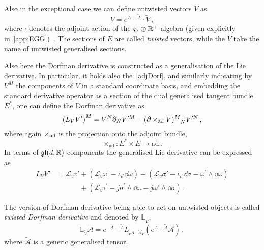 \documentclass[debug]{phd}
\begin{document}
						Also in the exceptional case we can define untwisted vectors $\tilde{V}$ as 
								\begin{equation}
									V = e^{A+ \tilde{A}} \cdot \tilde{V} \, , 
								\end{equation}
						where $\cdot$ denotes the adjoint action of the $\mathfrak{e}_7 \oplus \mathbb{R}^+$ algebra (given explicitly in~\cref{app:EGG})~\cite{waldram5}.
						The sections of $E$ are called \emph{twisted} vectors, while the $\tilde{V}$ take the name of untwisted generalised sections.
							
						Also here the Dorfman derivative is constructed as a generalisation of the Lie derivative. 
						In particular, it holds also the~\eqref{adjDorf}, and similarly indicating by $V^M$ the components of $V$ in a standard coordinate basis, and embedding the standard derivative operator as a section of the dual generalised tangent bundle $E^*$, one can define the Dorfman derivative as
							\begin{equation}\label{dorfMadj}
								\left(L_V V'\right)^M = V^N \partial_N V^{\prime M} - (\partial \times_{\rm ad} V)^M_{\phantom{M}N} V^{\prime N} \, ,
							\end{equation}
						where again $ \times_{\rm ad}$ is the projection onto the adjoint bundle,
								\begin{equation}
									\times_{\mathrm{ad}} : E^* \times E \rightarrow \mathrm{ad}\, . 
								\end{equation}
						In terms of $\mathfrak{gl}(d, \mathbb{R})$ components the generalised Lie derivative can be expressed as
								\begin{equation}\label{dorfM}
									\begin{split}
									L_V V' &= \mathcal{L}_{v} v' + \left(\mathcal{L}_{v} \omega^{\prime} -\iota_{v^\prime}\dd \omega\right) + \left(\mathcal{L}_{v} \sigma' -\iota_{v^\prime}\dd\sigma - \omega^{\prime}\wedge \dd \omega\right) \\
										& \phantom{= \mathcal{L}_{v} v'}+ \left(\mathcal{L}_{v} \tau^{\prime} - j \sigma^{\prime}\wedge \dd \omega - j \omega' \wedge\dd\sigma \right) \, .
									\end{split}
								\end{equation}
						
						The version of Dorfman derivative being able to act on untwisted objects is called \emph{twisted Dorfman derivative} and denoted by $\mathbb{L}_{\tilde{V}}$,
								\begin{equation}
									\mathbb{L}_{\tilde{V}} \tilde{\mathcal{A}} = e^{-A-\tilde{A}}L_{e^{A+\tilde{A}} \tilde{V}} (e^{A+\tilde{A}}\tilde{\mathcal{A}}) \, ,
								\end{equation}
						where $\tilde{\mathcal{A}}$ is a generic generalised tensor.
						
\end{document}
